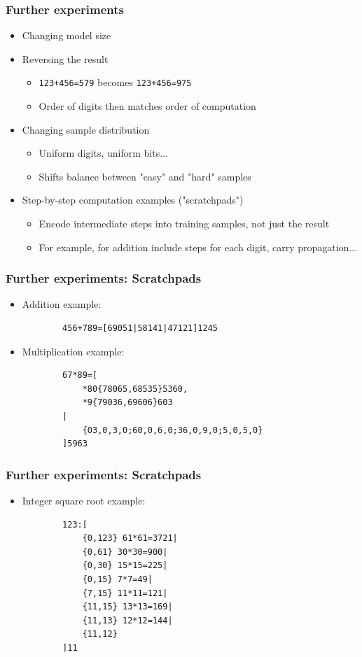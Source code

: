 \documentclass{beamer}
\begin{document}
\begin{frame}
\frametitle{Further experiments}
\begin{itemize}
    \item Changing model size
    \item Reversing the result
    \begin{itemize}
        \item \texttt{123+456=579} becomes \texttt{123+456=975}
        \item Order of digits then matches order of computation
    \end{itemize}
    \item Changing sample distribution
    \begin{itemize}
        \item Uniform digits, uniform bits...
        \item Shifts balance between "easy" and "hard" samples
    \end{itemize}
    \item Step-by-step computation examples ("scratchpads")
    \begin{itemize}
        \item Encode intermediate steps into training samples, not just the result
        \item For example, for addition include steps for each digit, carry propagation...
    \end{itemize}
\end{itemize}
\end{frame}

\begin{frame}[fragile]
\frametitle{Further experiments: Scratchpads}
\begin{itemize}
    \item Addition example:
    \begin{verbatim}
        456+789=[69051|58141|47121]1245
    \end{verbatim}
    \item Multiplication example:
    \begin{verbatim}
        67*89=[
            *80{78065,68535}5360,
            *9{79036,69606}603
        |
            {03,0,3,0;60,0,6,0;36,0,9,0;5,0,5,0}
        ]5963
    \end{verbatim}
\end{itemize}
\end{frame}

\begin{frame}[fragile]
\frametitle{Further experiments: Scratchpads}
\begin{itemize}
    \item Integer square root example:
    \begin{verbatim}
        123:[
            {0,123} 61*61=3721|
            {0,61} 30*30=900|
            {0,30} 15*15=225|
            {0,15} 7*7=49|
            {7,15} 11*11=121|
            {11,15} 13*13=169|
            {11,13} 12*12=144|
            {11,12}
        ]11
    \end{verbatim}
\end{itemize}
\end{frame}
\end{document}
